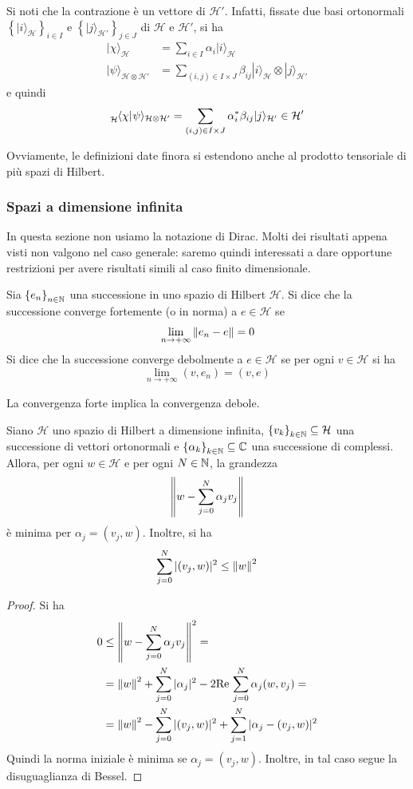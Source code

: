 \documentclass[a4paper, 11pt]{article}
\renewcommand{\H}{\mathcal{H}}
\renewcommand{\ket}[1]{| #1\rangle}
\renewcommand{\bra}[1]{\langle #1|}
\begin{document}
Si noti che la contrazione è un vettore di $\H'$. Infatti, fissate due basi ortonormali $\left\{\ket{i}_\H\right\}_{i\in I}$ e $\left\{\ket{j}_{\H'}\right\}_{j\in J}$ di $\H$ e $\H'$, si ha
\begin{align*}
	\ket{\chi}_\H&=\sum_{i\in I}\alpha_{i}\ket{i}_\H\\
	\ket{\psi}_{\H\otimes\H'}&=\sum_{(i,j)\in I\times J}\beta_{ij}\ket{i}_\H\otimes\ket{j}_{\H'}
\end{align*}
e quindi
\[\tensor*[_{\H}]{\bra{\chi}}{}\psi\rangle_{\H\otimes\H'}=\sum_{(i,j)\in I\times J}\alpha_i^*\beta_{ij}\ket{j}_{\H'}\in \H'\]

\noindent Ovviamente, le definizioni date finora si estendono anche al prodotto tensoriale di più spazi di Hilbert.
\subsubsection{Spazi a dimensione infinita}
In questa sezione non usiamo la notazione di Dirac. Molti dei risultati appena visti non valgono nel caso generale: saremo quindi interessati a dare opportune restrizioni per avere risultati simili al caso finito dimensionale.
\begin{definition}
	Sia $\left\{e_n\right\}_{n\in\mathbb{N}}$ una successione in uno spazio di Hilbert $\H$. Si dice che la successione converge fortemente (o in norma) a $e\in\H$ se
	\[\lim\limits_{n\to+\infty}\left\Vert e_n-e\right\Vert=0\]
	Si dice che la successione converge debolmente a $e\in\H$ se per ogni $v\in\H$ si ha
	\[\lim\limits_{n\to+\infty}(v,e_n)=(v,e)\]
\end{definition}
\begin{lemma}
	La convergenza forte implica la convergenza debole.
\end{lemma}
\begin{lemma} Siano $\H$ uno spazio di Hilbert a dimensione infinita, $\left\{v_k\right\}_{k\in\N}\subseteq\H$ una successione di vettori ortonormali e $\left\{\alpha_k\right\}_{k\in \mathbb{N}}\subseteq\mathbb{C}$ una successione di complessi. Allora, per ogni $w\in\H$ e per ogni $N\in \mathbb{N}$, la grandezza
	\[\left\Vert w-\sum_{j=0}^{N}\alpha_jv_j\right\Vert\]
è minima per $\alpha_j=(v_j,w)$. Inoltre, si ha
\[\sum_{j=0}^{N}|(v_j,w)|^2\leq\left\Vert w\right\Vert^2\]
\end{lemma}
\begin{proof}
	Si ha 
	\begin{align*}
	0&\leq\left\Vert w-\sum_{j=0}^{N}\alpha_jv_j\right\Vert^2=\\&=\left\Vert w\right\Vert^2+\sum_{j=0}^{N}|\alpha_j|^2-2\mathrm{Re}\,\sum_{j=0}^{N}\alpha_j(w,v_j)=\\&=\left\Vert w\right\Vert^2-\sum_{j=0}^{N}|(v_j,w)|^2+\sum_{j=1}^{N}|\alpha_j-(v_j,w)|^2
	\end{align*}
	Quindi la norma iniziale è minima se $\alpha_j=(v_j,w)$. Inoltre, in tal caso segue la disuguaglianza di Bessel.
\end{proof}
\end{document}
